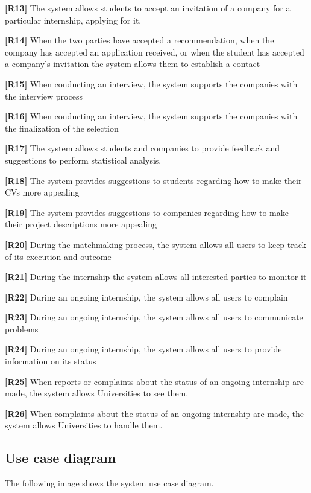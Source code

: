 \textbf{[R13]} The system allows students to accept an invitation of a company for a particular internship, applying for it.

\textbf{[R14]}  When the two parties have accepted a recommendation, when the company has accepted an application received, or when the student has accepted a company's invitation the system allows them to establish a contact

\textbf{[R15]} When conducting an interview, the system supports the companies with the interview process

\textbf{[R16]} When conducting an interview, the system supports the companies with the finalization of the selection

\textbf{[R17]} The system allows students and companies to provide feedback and suggestions to perform statistical analysis.

\textbf{[R18] }The system provides suggestions to students regarding how to make their CVs more appealing

\textbf{[R19]} The system provides suggestions to companies regarding how to make their project descriptions more appealing

\textbf{[R20]} During the matchmaking process, the system allows all users to keep track of its execution and outcome

\textbf{[R21]} During the internship the system allows all interested parties to monitor it

\textbf{[R22]} During an ongoing internship, the system allows all users to complain 

\textbf{[R23]} During an ongoing internship, the system allows all users to communicate problems 

\textbf{[R24]} During an ongoing internship, the system allows all users to provide information on its status

\textbf{[R25]} When reports or complaints about the status of an ongoing internship are made, the system allows Universities to see them.

\textbf{[R26]} When complaints about the status of an ongoing internship are made, the system allows Universities to handle them.

\pagebreak

\subsection{Use case diagram}

The following image shows the system use case diagram.

